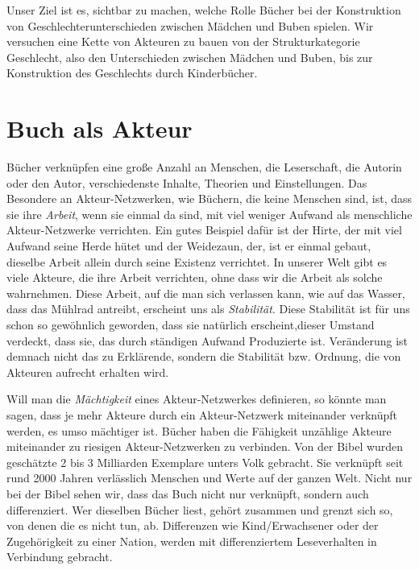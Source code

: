 Unser Ziel ist es, sichtbar zu machen, welche Rolle Bücher bei der Konstruktion von Geschlechterunterschieden zwischen Mädchen und Buben spielen. Wir versuchen eine Kette von Akteuren zu bauen von der Strukturkategorie Geschlecht, also den Unterschieden zwischen Mädchen und Buben, bis zur Konstruktion des Geschlechts durch Kinderbücher. 



\section{Buch als Akteur}

Bücher verknüpfen eine große Anzahl an Menschen, die Leserschaft, die Autorin oder den Autor, verschiedenste Inhalte, Theorien und Einstellungen.
Das Besondere an Akteur-Netzwerken, wie Büchern, die keine Menschen sind, ist, dass sie ihre \emph{Arbeit}, wenn sie einmal da sind, mit viel weniger Aufwand als menschliche Akteur-Netzwerke verrichten.
Ein gutes Beispiel dafür ist der Hirte, der mit viel Aufwand seine Herde hütet und der Weidezaun, der, ist er einmal gebaut, dieselbe Arbeit allein durch seine Existenz verrichtet.
In unserer Welt gibt es viele Akteure, die ihre Arbeit verrichten, ohne dass wir die Arbeit als solche wahrnehmen.
Diese Arbeit, auf die man sich verlassen kann, wie auf das Wasser, dass das Mühlrad antreibt, erscheint uns als \emph{Stabilität}.
Diese Stabilität ist für uns schon so gewöhnlich geworden, dass sie natürlich erscheint,dieser Umstand verdeckt, dass sie, das durch ständigen Aufwand Produzierte ist.
Veränderung ist demnach nicht das zu Erklärende, sondern die Stabilität bzw. Ordnung, die von Akteuren aufrecht erhalten wird.


Will man die \emph{Mächtigkeit} eines Akteur-Netzwerkes definieren, so könnte man sagen, dass je mehr Akteure durch ein Akteur-Netzwerk miteinander verknüpft werden, es umso mächtiger ist.
Bücher haben die Fähigkeit unzählige Akteure miteinander zu riesigen Akteur-Netzwerken zu verbinden.
Von der Bibel wurden \zB geschätzte 2 bis 3 Milliarden Exemplare unters Volk gebracht. Sie verknüpft seit rund 2000 Jahren verlässlich Menschen und Werte auf der ganzen Welt.
Nicht nur bei der Bibel sehen wir, dass das Buch nicht nur verknüpft, sondern auch differenziert. Wer dieselben Bücher liest, gehört zusammen und grenzt sich so, von denen die es nicht tun, ab. Differenzen wie Kind/Erwachsener oder der Zugehörigkeit zu einer Nation, werden mit differenziertem Leseverhalten in Verbindung gebracht.
\parencites[Kap.\,3 in][]{Postman2011}[50]{McLuhan2012}

